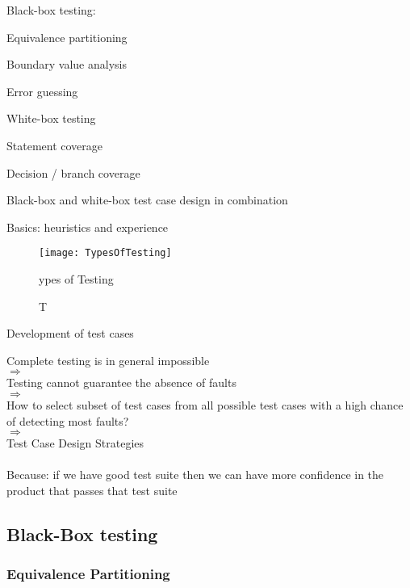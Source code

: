 \begin{itemize*}
	\item Black-box testing:
	\begin{itemize*}
		\item Equivalence partitioning
		\item Boundary value analysis
		\item Error guessing
	\end{itemize*}
	\item White-box testing
	\begin{itemize*}
		\item Statement coverage
		\item Decision / branch coverage
	\end{itemize*}
	\item Black-box and white-box test case design in combination
	\item Basics: heuristics and experience
\end{itemize*}

\begin{figure}
	\centering
	\texttt{[image: TypesOfTesting]}
	\caption Types of Testing
\end{figure}

Development of test cases

\begin{center}
Complete testing is in general impossible\\ $\Rightarrow$\\
Testing cannot guarantee the absence of faults\\ $\Rightarrow$\\
How to select subset of test cases from all possible test cases with a high chance of detecting most faults?\\
$\Rightarrow$\\
Test Case Design Strategies\\
~\\
Because: if we have good test suite then we can have more confidence in the product that passes that test suite
\end{center}

\subsection{Black-Box testing}

\subsubsection{Equivalence Partitioning}

